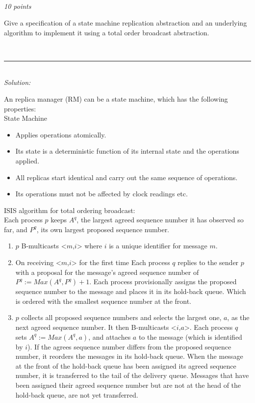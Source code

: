 \documentclass[a4paper]{article}
\newcommand{\horrule}[1]{\rule{\linewidth}{#1}} %
\newcommand{\oklarhet}[1]{%
  \noindent\fbox{\parbox[b][4em][t]{\textwidth}{\color{red}#1} }%
}
\newcommand{\points}[1]{\subsection{} \textit{#1 points}\\}
\newcommand{\question}[2][]{
  \noindent
  \parbox[t]{\textwidth}{#1 \parbox[t]{0.95\textwidth}{#2}}\\
}
\newcommand{\solution}[1]{\horrule{0.5pt}\\[3pt]\textit{Solution: }\\\begin{minipage}{\textwidth}#1\end{minipage}}
\begin{document}
\points{10}
\question{
  Give a specification of a state machine replication abstraction and
  an underlying algorithm to implement it using a total order broadcast
  abstraction.
}
\oklarhet{Bad formulation of the question?}
\solution{
  An replica manager (RM) can be a state machine, which has the
  following properties:\\
  State Machine
  \begin{itemize}
    \item Applies operations atomically.
    \item Its state is a deterministic function of its internal state
      and the operations applied.
    \item All replicas start identical and carry out the same sequence
      of operations.
    \item Its operations must not be affected by clock readings etc.
  \end{itemize}

  ISIS algorithm for total ordering broadcast:\\
  Each process $p$ keeps $A^q$, the largest agreed sequence number it
  has observed so far, and $P^q$, its own largest proposed sequence
  number.
  \begin{enumerate}
    \item $p$ B-multicasts <$m$,$i$> where $i$ is a unique identifier
      for message $m$.
    \item On receiving <$m$,$i$> for the first time
      Each process $q$ replies to the sender $p$ with a proposal
      for the message's agreed sequence number of $P^q := Max(A^q,
      P^q)+1$. Each process provisionally assigns the proposed
      sequence number to the message and places it in its hold-back
      queue. Which is ordered with the smallest sequence number at the front.
    \item $p$ collects all proposed sequence numbers and selects the
      largest one, $a$, as the next agreed sequence number. It then
      B-multicasts <$i$,$a$>. Each process $q$ sets $A^q := Max(A^q,
      a)$, and attaches $a$ to the message (which is identified by
      $i$). If the agrees sequence number differs from the proposed
      sequence number, it reorders the messages in its hold-back
      queue. When the message at the front of the hold-back queue has
      been assigned its agreed sequence number, it is transferred to
      the tail of the delivery queue. Messages that have been assigned
      their agreed sequence number but are not at the head of the
      hold-back queue, are not yet transferred.
  \end{enumerate}

}
\end{document}
